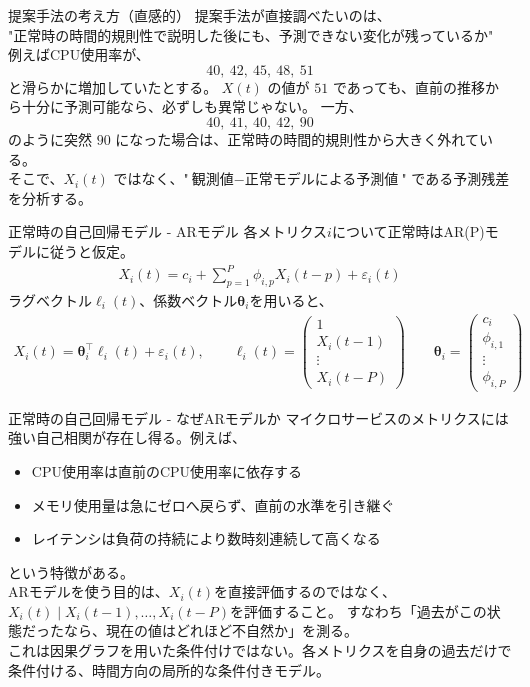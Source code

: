 \documentclass[dvipdfmx, 11pt, aspectratio=169, notheorems]{beamer}
\begin{document}
\begin{frame}{提案手法の考え方（直感的）}
    提案手法が直接調べたいのは、\\
    "正常時の時間的規則性で説明した後にも、予測できない変化が残っているか"\\
    例えばCPU使用率が、
    \[40,\ 42,\ 45,\ 48,\ 51\] と滑らかに増加していたとする。
    \(X(t)\) の値が \(51\) であっても、直前の推移から十分に予測可能なら、必ずしも異常じゃない。
    一方、\[40,\ 41,\ 40,\ 42,\ 90\]
    のように突然 \(90\) になった場合は、正常時の時間的規則性から大きく外れている。\\
    そこで、\(X_i(t)\) ではなく、"$\text{観測値} - \text{正常モデルによる予測値}$"
    である予測残差を分析する。
\end{frame}

\begin{frame}{正常時の自己回帰モデル - ARモデル}
    各メトリクス$i$について正常時はAR(P)モデルに従うと仮定。
    \begin{align}
        X_i(t) = c_i + \sum_{p=1}^{P} \phi_{i,p}X_i(t-p) + \varepsilon_i(t)
    \end{align}
    ラグベクトル$\boldsymbol{\ell}_i(t)$、係数ベクトル$\boldsymbol{\theta}_i$を用いると、
    \begin{align}
        X_i(t) = \boldsymbol{\theta}_i^\top \boldsymbol{\ell}_i(t) + \varepsilon_i(t) , \qquad
        \boldsymbol{\ell}_i(t) =
        \begin{pmatrix}
            1\\
            X_i(t-1)\\
            \vdots\\
            X_i(t-P)
        \end{pmatrix}
        \qquad \boldsymbol{\theta}_i =
        \begin{pmatrix}
            c_i\\
            \phi_{i,1}\\
            \vdots\\
            \phi_{i,P}
        \end{pmatrix}
    \end{align}
\end{frame}

\begin{frame}{正常時の自己回帰モデル - なぜARモデルか}
    マイクロサービスのメトリクスには強い自己相関が存在し得る。例えば、
    \begin{itemize}
        \item CPU使用率は直前のCPU使用率に依存する
        \item メモリ使用量は急にゼロへ戻らず、直前の水準を引き継ぐ
        \item レイテンシは負荷の持続により数時刻連続して高くなる
    \end{itemize}
    という特徴がある。\\
    ARモデルを使う目的は、$X_i(t)$を直接評価するのではなく、
    $ X_i(t) \mid X_i(t-1),\ldots,X_i(t-P) $を評価すること。
    すなわち「過去がこの状態だったなら、現在の値はどれほど不自然か」を測る。\\
    これは因果グラフを用いた条件付けではない。各メトリクスを自身の過去だけで条件付ける、時間方向の局所的な条件付きモデル。
\end{frame}
\end{document}
